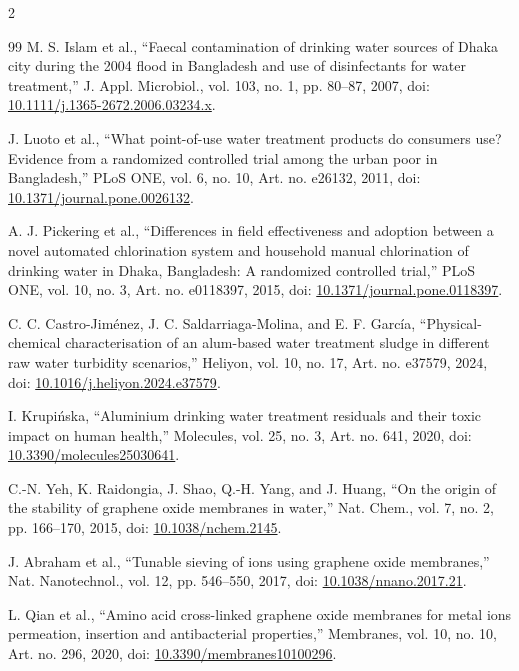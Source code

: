 \documentclass{ieeeaccess}
\begin{document}
\begin{multicols}{2}
\begin{thebibliography}{99}
 M. S. Islam et al., ``Faecal contamination of drinking water sources of Dhaka city during the 2004 flood in Bangladesh and use of disinfectants for water treatment,'' J. Appl. Microbiol., vol. 103, no. 1, pp. 80--87, 2007, doi: \href{https://doi.org/10.1111/j.1365-2672.2006.03234.x}{10.1111/j.1365-2672.2006.03234.x}.

 J. Luoto et al., ``What point-of-use water treatment products do consumers use? Evidence from a randomized controlled trial among the urban poor in Bangladesh,'' PLoS ONE, vol. 6, no. 10, Art. no. e26132, 2011, doi: \href{https://doi.org/10.1371/journal.pone.0026132}{10.1371/journal.pone.0026132}.

 A. J. Pickering et al., ``Differences in field effectiveness and adoption between a novel automated chlorination system and household manual chlorination of drinking water in Dhaka, Bangladesh: A randomized controlled trial,'' PLoS ONE, vol. 10, no. 3, Art. no. e0118397, 2015, doi: \href{https://doi.org/10.1371/journal.pone.0118397}{10.1371/journal.pone.0118397}.

 C. C. Castro-Jiménez, J. C. Saldarriaga-Molina, and E. F. García, ``Physical-chemical characterisation of an alum-based water treatment sludge in different raw water turbidity scenarios,'' Heliyon, vol. 10, no. 17, Art. no. e37579, 2024, doi: \href{https://doi.org/10.1016/j.heliyon.2024.e37579}{10.1016/j.heliyon.2024.e37579}.

 I. Krupińska, ``Aluminium drinking water treatment residuals and their toxic impact on human health,'' Molecules, vol. 25, no. 3, Art. no. 641, 2020, doi: \href{https://doi.org/10.3390/molecules25030641}{10.3390/molecules25030641}.

 C.-N. Yeh, K. Raidongia, J. Shao, Q.-H. Yang, and J. Huang, ``On the origin of the stability of graphene oxide membranes in water,'' Nat. Chem., vol. 7, no. 2, pp. 166--170, 2015, doi: \href{https://doi.org/10.1038/nchem.2145}{10.1038/nchem.2145}.

 J. Abraham et al., ``Tunable sieving of ions using graphene oxide membranes,'' Nat. Nanotechnol., vol. 12, pp. 546--550, 2017, doi: \href{https://doi.org/10.1038/nnano.2017.21}{10.1038/nnano.2017.21}.

 L. Qian et al., ``Amino acid cross-linked graphene oxide membranes for metal ions permeation, insertion and antibacterial properties,'' Membranes, vol. 10, no. 10, Art. no. 296, 2020, doi: \href{https://doi.org/10.3390/membranes10100296}{10.3390/membranes10100296}.


\end{thebibliography}
\end{multicols}
\end{document}
